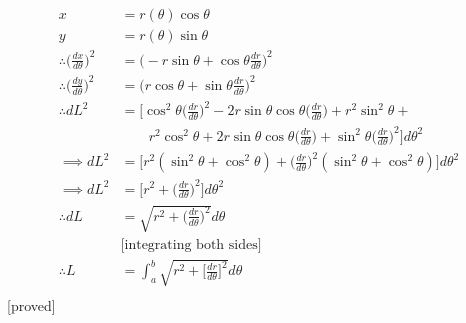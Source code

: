 \documentclass{article}
\begin{document}
{\begin{align*}
    x &= r(\theta) \cos\theta\\
    y&=r(\theta) \sin \theta\\
    \therefore \Bigg(\frac{dx}{d\theta}\Bigg)^2 &= \Bigg(-r\sin\theta+\cos\theta\frac{dr}{d\theta}\Bigg)^2\\
    \therefore \Bigg(\frac{dy}{d\theta}\Bigg)^2 &= \Bigg(r\cos\theta+\sin\theta\frac{dr}{d\theta}\Bigg)^2\\
    \therefore dL^2 &= \Bigg[\cos^2\theta\Bigg(\frac{dr}{d\theta}\Bigg)^2-2r\sin\theta \cos\theta \Bigg(\frac{dr}{d\theta}\Bigg)+r^2\sin^2\theta +\\&\hspace{2em}r^2\cos^2\theta+2r\sin\theta \cos\theta\Bigg(\frac{dr}{d\theta}\Bigg)+\sin^2\theta\Bigg(\frac{dr}{d\theta}\Bigg)^2\Bigg]d\theta^2\\
    \implies dL^2 &= \Bigg[r^2(\sin^2\theta+\cos^2\theta)+\Bigg(\frac{dr}{d\theta}\Bigg)^2(\sin^2\theta + \cos^2\theta)\Bigg]d\theta^2\\
    \implies dL^2 &= \Bigg[r^2+\Bigg(\frac{dr}{d\theta}\Bigg)^2\Bigg]d\theta^2\\
    \therefore dL &= \sqrt{r^2+\Bigg(\frac{dr}{d\theta}\Bigg)^2}d\theta\\
    &\text{[integrating both sides]}\\
    \therefore L &= \int_a^b\sqrt{r^2+\Bigg[\frac{dr}{d\theta}\Bigg]^2}d\theta\\
\end{align*}
\hspace{7cm}[proved]

}
\newpage
\end{document}
